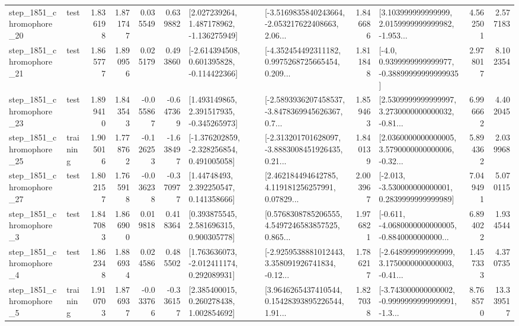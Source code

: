 \begin{tabular}{llrrrrllrlrr}
 step\_1851\_chromophore\_20 &      test &      1.836198 &    1.871747 &      0.035549 &  0.639882 &    [2.027239264, 1.487178962, -1.136275949] &  [-3.5169835840243664, -2.053217622408663, 2.06... &       1.846686 &  [3.103999999999999, 2.0159999999999982, -1.953... &            4.562501 &          2.577183 \\
 step\_1851\_chromophore\_21 &      test &      1.865777 &    1.890956 &      0.025179 &  0.493860 &   [-2.614394508, 0.601395828, -0.114422366] &  [-4.352454492311182, 0.9975268725665454, 0.209... &       1.811848 &   [-4.0, 0.9399999999999977, -0.38899999999999935] &            2.978017 &          8.102354 \\
 step\_1851\_chromophore\_23 &      test &      1.899410 &    1.843543 &     -0.055867 & -0.647369 &    [1.493149865, 2.391517935, -0.345265973] &  [-2.5893936207458537, -3.8478369945626367, 0.7... &       1.859463 &  [2.5309999999999997, 3.2730000000000032, -0.81... &            6.996662 &          4.402045 \\
 step\_1851\_chromophore\_25 &  training &      1.905016 &    1.778762 &     -0.126253 & -1.638497 &   [-1.376202859, -2.328256854, 0.491005058] &  [-2.313201701628097, -3.8883008451926435, 0.21... &       1.840139 &  [2.0360000000000005, 3.5790000000000006, -0.32... &            5.894362 &          2.039968 \\
 step\_1851\_chromophore\_27 &      test &      1.802157 &    1.765918 &     -0.036238 & -0.370977 &      [1.44748493, 2.392250547, 0.141358666] &  [2.462184494642785, 4.119181256257991, 0.07829... &       2.003967 &   [-2.013, -3.530000000000001, 0.2839999999999989] &            7.049491 &          5.070115 \\
  step\_1851\_chromophore\_3 &      test &      1.847083 &    1.866900 &      0.019818 &  0.418364 &     [0.393875545, 2.581696315, 0.900305778] &  [0.5768308785206555, 4.5497246583857525, 0.865... &       1.976821 &  [-0.611, -4.0680000000000005, -0.8840000000000... &            6.894022 &          1.934544 \\
  step\_1851\_chromophore\_4 &      test &      1.862348 &    1.886934 &      0.024586 &  0.485502 &    [1.763636073, -2.012411174, 0.292089931] &  [-2.9259538881012443, 3.358091926741834, -0.12... &       1.786217 &  [-2.648999999999999, 3.1750000000000003, -0.41... &            1.457333 &          4.370735 \\
  step\_1851\_chromophore\_5 &  training &      1.910703 &    1.876937 &     -0.033766 & -0.336157 &     [2.385400015, 0.260278438, 1.002854692] &  [3.9646265437410544, 0.15428393895226544, 1.91... &       1.827038 &  [-3.743000000000002, -0.9999999999999991, -1.3... &            8.768570 &         13.339517 \\

\end{tabular}
